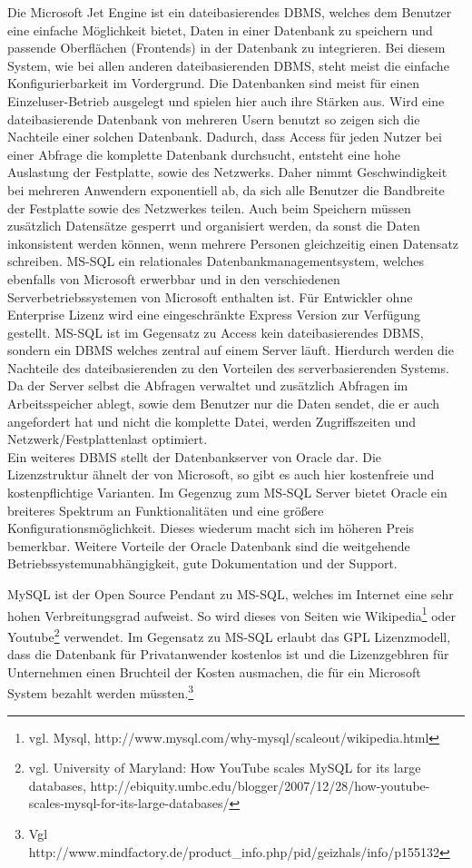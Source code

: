 Die Microsoft Jet Engine ist ein dateibasierendes DBMS, welches dem Benutzer eine einfache Möglichkeit bietet, Daten in einer Datenbank zu speichern und passende Oberflächen (Frontends) in der Datenbank zu integrieren.
Bei diesem System, wie bei allen anderen dateibasierenden DBMS, steht meist die einfache Konfigurierbarkeit im Vordergrund. Die Datenbanken sind meist für einen Einzeluser-Betrieb ausgelegt und spielen hier auch ihre Stärken aus.
Wird eine dateibasierende Datenbank von mehreren Usern benutzt so zeigen sich die Nachteile einer solchen Datenbank.
Dadurch, dass Access für jeden Nutzer bei einer Abfrage die komplette Datenbank durchsucht, entsteht eine hohe Auslastung der Festplatte, sowie des Netzwerks. Daher nimmt Geschwindigkeit bei mehreren Anwendern exponentiell ab, da sich alle Benutzer die Bandbreite der Festplatte sowie des Netzwerkes teilen.
Auch beim Speichern müssen zusätzlich Datensätze gesperrt und organisiert werden, da sonst die Daten inkonsistent werden können, wenn mehrere Personen gleichzeitig einen Datensatz schreiben.
MS-SQL ein relationales Datenbankmanagementsystem, welches ebenfalls von Microsoft erwerbbar
und in den verschiedenen Serverbetriebssystemen von Microsoft enthalten ist. Für Entwickler
ohne Enterprise Lizenz wird eine eingeschränkte Express Version zur Verfügung gestellt. MS-SQL ist im Gegensatz zu Access kein dateibasierendes DBMS, sondern ein DBMS welches
zentral auf einem Server läuft. Hierdurch werden die Nachteile des dateibasierenden zu
den Vorteilen des serverbasierenden Systems. Da der Server selbst die Abfragen verwaltet
und zusätzlich Abfragen im Arbeitsspeicher ablegt, sowie dem Benutzer nur die Daten
sendet, die er auch angefordert hat und nicht die komplette Datei, werden Zugriffszeiten
und Netzwerk/Festplattenlast optimiert.\\
Ein weiteres DBMS stellt der Datenbankserver von Oracle dar. Die Lizenzstruktur ähnelt der von Microsoft, so gibt es auch hier kostenfreie und kostenpflichtige Varianten. Im Gegenzug zum MS-SQL Server bietet Oracle ein breiteres Spektrum an Funktionalitäten und eine größere Konfigurationsmöglichkeit. Dieses wiederum macht sich im höheren Preis bemerkbar. Weitere Vorteile der Oracle Datenbank sind die weitgehende Betriebssystemunabhängigkeit, gute Dokumentation und der Support.

MySQL ist der Open Source Pendant zu MS-SQL, welches im Internet eine sehr hohen Verbreitungsgrad aufweist.
So wird dieses von Seiten wie Wikipedia\footnote{vgl. Mysql, http://www.mysql.com/why-mysql/scaleout/wikipedia.html} oder
Youtube\footnote{vgl. University of Maryland: How YouTube scales MySQL for its large databases, http://ebiquity.umbc.edu/blogger/2007/12/28/how-youtube-scales-mysql-for-its-large-databases/} verwendet.
Im Gegensatz zu MS-SQL erlaubt das GPL Lizenzmodell, dass die Datenbank für Privatanwender kostenlos ist und die Lizenzgebhren für Unternehmen einen Bruchteil der Kosten ausmachen, die für ein Microsoft System bezahlt werden müssten.\footnote{Vgl http://www.mindfactory.de/product\_info.php/pid/geizhals/info/p155132}


